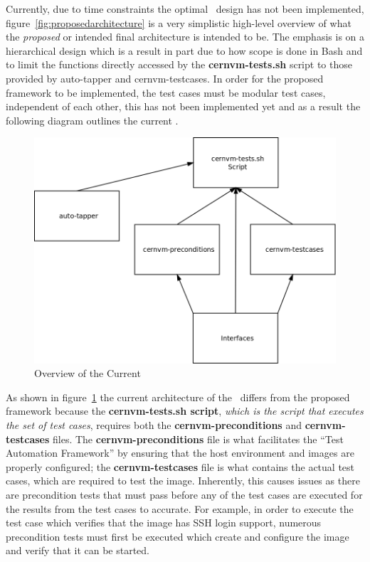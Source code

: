 \newpage
Currently, due to time constraints the optimal \cernvmtestframework\ design has not been implemented, figure~\ref{fig:proposedarchitecture} is a very
simplistic high-level overview of what the \emph{proposed} or intended final architecture is intended to be. The emphasis is on a hierarchical design
which is a result in part due to how scope is done in Bash and to limit the functions directly accessed by the {\bf cernvm-tests.sh} script to those
provided by auto-tapper and cernvm-testcases. In order for the proposed framework to be implemented, the \cernvm test cases must be modular test 
cases, independent of each other, this has not been implemented yet and as a result the following diagram outlines the current \cernvmtestframework.

\begin{figure}[hbp]
	\begin{center}
		\includegraphics[scale=0.25]{img/current_framework.png}
	\end{center}
	\caption{Overview of the Current \cernvmtestframework}
	\label{fig:currentarchitecture}
\end{figure}

As shown in figure~\ref{fig:currentarchitecture} the current architecture of the \cernvmtestframework\ differs from the proposed framework because the
{\bf cernvm-tests.sh script}, \emph{which is the script that executes the set of \cernvm test cases}, requires both the {\bf cernvm-preconditions}
and {\bf cernvm-testcases} files. The {\bf cernvm-preconditions} file is what facilitates the ``Test Automation Framework'' by ensuring
that the host environment and \cernvm images are properly configured; the {\bf cernvm-testcases} file is what contains the actual
\cernvmreleasetesting test cases, which are required to test the \cernvm image. Inherently, this causes issues as there are precondition tests
that must pass before any of the test cases are executed for the results from the test cases to accurate. For example, in order to execute the test
case which verifies that the \cernvm image has SSH login support, numerous precondition tests must first be executed which create and configure the \cernvm image and verify that it can be started.

